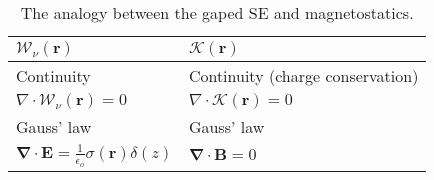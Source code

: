 \documentclass[10pt]{article}
\begin{document}
\begin{table}[h]
\begin{minipage}{.95\textwidth}
\begin{center}
\begin{tabular}{ | p{7cm} | p{7cm} | }
				$\boldsymbol{\mathscr{W}}_{\nu}(\boldsymbol{r})$
				                                                                                                                                                                                                                                            & $\boldsymbol{\mathscr{K}}(\boldsymbol{r})$                                                                                                                                                                                \\ \hline
				Continuity                                                                                                                                                                                                                                  & Continuity (charge conservation)                                                                                                                                                                                          \\
				$\nabla \cdot \boldsymbol{\mathscr{W}}_{\nu}(\boldsymbol{r}) = 0 $
				                                                                                                                                                                                                                                            & $\nabla \cdot \boldsymbol{\mathscr{K}}(\boldsymbol{r}) = 0$                                                                                                                                                               \\\hline
				Gauss' law                                                                                                                                                                                                                                  & Gauss' law                                                                                                                                                                                                                \\
				$\boldsymbol{\nabla}\cdot\boldsymbol{E} = \frac{1}{\epsilon_o}\sigma(\boldsymbol{r})\delta(z)$
				                                                                                                                                                                                                                                            & $\boldsymbol{\nabla}\cdot\boldsymbol{B}=0$                                                                                                                                                                                \\
				\hline
			\end{tabular}
			\caption {The analogy between the gaped SE and magnetostatics.}
			\label{analogiesTableEq}
		\end{center}
	\end{minipage}%
\end{table}
\end{document}

